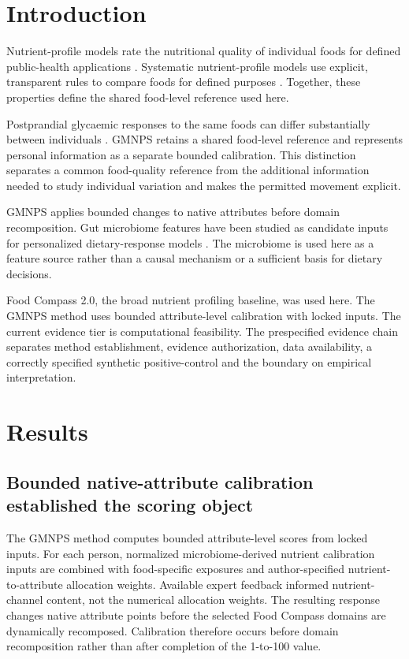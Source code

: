 \section*{Introduction}

Nutrient-profile models rate the nutritional quality of individual foods for defined public-health applications \cite{labonte2018nutrientprofiles}.
Systematic nutrient-profile models use explicit, transparent rules to compare foods for defined purposes \cite{scarborough2007developing}.
Together, these properties define the shared food-level reference used here.

Postprandial glycaemic responses to the same foods can differ substantially between individuals \cite{zeevi2015personalized}.
GMNPS retains a shared food-level reference and represents personal information as a separate bounded calibration.
This distinction separates a common food-quality reference from the additional
information needed to study individual variation and makes the permitted
movement explicit.

GMNPS applies bounded changes to native attributes before domain recomposition.
Gut microbiome features have been studied as candidate inputs for personalized dietary-response models \cite{zeevi2015personalized}.
The microbiome is used here as a feature source rather than a causal mechanism
or a sufficient basis for dietary decisions.

Food Compass 2.0, the broad nutrient profiling baseline, was used here.
The GMNPS method uses bounded attribute-level calibration with locked inputs.
The current evidence tier is computational feasibility. The prespecified
evidence chain separates method establishment, evidence authorization, data
availability, a correctly specified synthetic positive-control and the
boundary on empirical interpretation.

\section*{Results}

\subsection*{Bounded native-attribute calibration established the scoring object}

The GMNPS method computes bounded attribute-level scores from locked inputs.
For each person, normalized microbiome-derived nutrient calibration inputs are
combined with food-specific exposures and author-specified nutrient-to-attribute
allocation weights. Available expert feedback informed nutrient-channel content,
not the numerical allocation weights.
The resulting response changes native attribute points before the selected Food Compass domains are dynamically recomposed. Calibration therefore occurs before domain recomposition rather than after completion of the 1-to-100 value.

